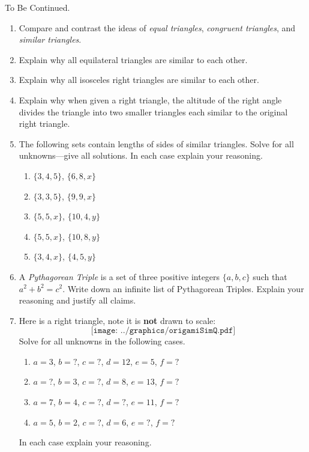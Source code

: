 \begin{center}
To Be Continued.
\end{center}





\begin{problems}
\begin{enumerate}
\item Compare and contrast the ideas of \textit{equal triangles},
  \textit{congruent triangles}, and \textit{similar triangles}.
\item Explain why all equilateral triangles are similar to each other.
\item Explain why all isosceles right triangles are similar to each other. 
\item Explain why when given a right triangle, the altitude of the
  right angle divides the triangle into two smaller triangles each
  similar to the original right triangle.
\item The following sets contain lengths of sides of similar
  triangles. Solve for all unknowns---give all solutions. In each case
  explain your reasoning.
\begin{enumerate}
\item $\{3,4,5\}$, $\{6,8,x\}$
\item $\{3,3,5\}$, $\{9,9,x\}$
\item $\{5,5,x\}$, $\{10,4,y\}$
\item $\{5,5,x\}$, $\{10,8,y\}$
\item $\{3,4,x\}$, $\{4,5,y\}$ 
\end{enumerate}
\item A \textit{Pythagorean Triple} is a set
  of three positive integers $\{a,b,c\}$ such that $a^2 + b^2 =
  c^2$. Write down an infinite list of Pythagorean Triples. Explain
  your reasoning and justify all claims.
\item Here is a right triangle, note it is \textbf{not} drawn to
  scale:
\[
\texttt{[image: ../graphics/origamiSimQ.pdf]}
\]
Solve for all unknowns in the following cases.
\begin{enumerate}
\item $a = 3$, $b = ?$, $c = ?$, $d = 12$, $e = 5$, $f = ?$
\item $a = ?$, $b = 3$, $c = ?$, $d =8$, $e = 13$, $f = ?$
\item $a = 7$, $b = 4$, $c = ?$, $d =?$, $e = 11$, $f = ?$
\item $a = 5$, $b = 2$, $c = ?$, $d =6$, $e = ?$, $f = ?$
\end{enumerate}
In each case explain your reasoning.


\end{enumerate}
\end{problems}
